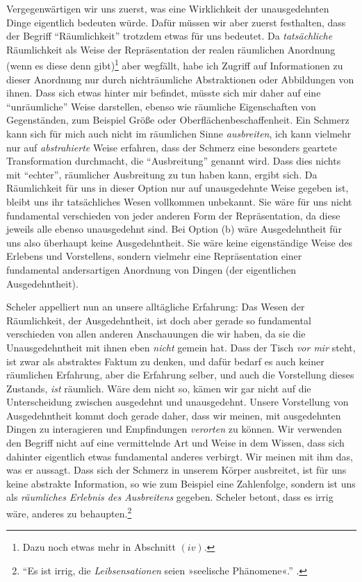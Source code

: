 \documentclass[a4paper, 12pt]{article}
\begin{document}
\begin{onehalfspace}
Vergegenwärtigen wir uns zuerst, was eine Wirklichkeit der unausgedehnten Dinge eigentlich bedeuten würde. Dafür müssen wir aber zuerst festhalten, dass der Begriff "`Räumlichkeit"' trotzdem etwas für uns bedeutet. Da \emph{tatsächliche} Räumlichkeit als Weise der Repräsentation der realen räumlichen Anordnung (wenn es diese denn gibt)\footnote{Dazu noch etwas mehr in Abschnitt $(iv)$.} aber wegfällt, habe ich Zugriff auf Informationen zu dieser Anordnung nur durch nichträumliche Abstraktionen oder Abbildungen von ihnen. Dass sich etwas hinter mir befindet, müsste sich mir daher auf eine "`unräumliche"' Weise darstellen, ebenso wie räumliche Eigenschaften von Gegenständen, zum Beispiel Größe oder Oberflächen\-be\-schaf\-fenheit. Ein Schmerz kann sich für mich auch nicht im räumlichen Sinne \emph{ausbreiten}, ich kann vielmehr nur auf \emph{abstrahierte} Weise erfahren, dass der Schmerz eine besonders geartete Transformation durchmacht, die "`Ausbreitung"' genannt wird. Dass dies nichts mit "`echter"', räumlicher Ausbreitung zu tun haben kann, ergibt sich. Da Räumlichkeit für uns in dieser Option nur auf unausgedehnte Weise gegeben ist, bleibt uns ihr tatsächliches Wesen vollkommen unbekannt. Sie wäre für uns nicht fundamental verschieden von jeder anderen Form der Repräsentation, da diese jeweils alle ebenso unausgedehnt sind. Bei Option (b) wäre Ausgedehntheit für uns also überhaupt keine Ausgedehntheit. Sie wäre keine eigenständige Weise des Erlebens und Vorstellens, sondern vielmehr eine Repräsentation einer fundamental andersartigen Anordnung von Dingen (der eigentlichen Ausgedehntheit).

Scheler appelliert nun an unsere alltägliche Erfahrung: Das Wesen der Räumlichkeit, der Ausgedehntheit, ist doch aber gerade so fundamental verschieden von allen anderen Anschauungen die wir haben, da sie die Unausgedehntheit mit ihnen eben \emph{nicht} gemein hat. Dass der Tisch \emph{vor mir} steht, ist zwar als abstraktes Faktum zu denken, und dafür bedarf es auch keiner räumlichen Erfahrung, aber die Erfahrung selber, und auch die Vorstellung dieses Zustands, \emph{ist} räumlich. Wäre dem nicht so, kämen wir gar nicht auf die Unterscheidung zwischen ausgedehnt und unausgedehnt. Unsere Vorstellung von Ausgedehntheit kommt doch gerade daher, dass wir meinen, mit ausgedehnten Dingen zu interagieren und Empfindungen \emph{verorten} zu können. Wir verwenden den Begriff nicht auf eine vermittelnde Art und Weise in dem Wissen, dass sich dahinter eigentlich etwas fundamental anderes verbirgt. Wir meinen mit ihm das, was er aussagt. Dass sich der Schmerz in unserem Körper ausbreitet, ist für uns keine abstrakte Information, so wie zum Beispiel eine Zahlenfolge, sondern ist uns als \emph{räumliches Erlebnis des Ausbreitens} gegeben. Scheler betont, dass es irrig wäre, anderes zu behaupten.\footnote{"`Es ist irrig, die \emph{Leibsensationen} seien »seelische Phänomene«."' .} 


\end{onehalfspace}
\end{document}
